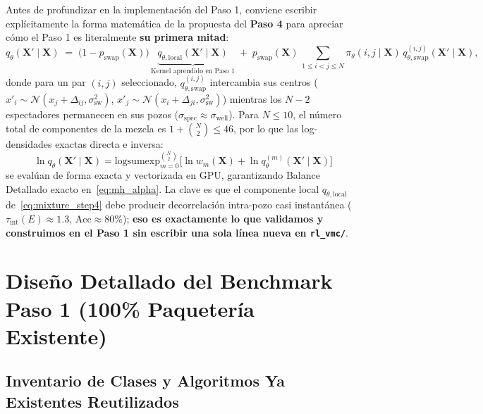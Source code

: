 \documentclass[10pt,a4paper]{article}
\begin{document}
Antes de profundizar en la implementación del Paso 1, conviene escribir explícitamente la forma matemática de la propuesta del \textbf{Paso 4} para apreciar cómo el Paso 1 es literalmente \textbf{su primera mitad}:
\begin{equation}
q_\theta(\bm{X}' \mid \bm{X}) \;=\; \big(1 - p_{\mathrm{swap}}(\bm{X})\big)\, \underbrace{q_{\theta,\mathrm{local}}(\bm{X}' \mid \bm{X})}_{\text{Kernel aprendido en Paso 1}} \;+\; p_{\mathrm{swap}}(\bm{X})\, \sum_{1 \le i < j \le N} \pi_\theta(i, j \mid \bm{X})\, q_{\theta,\mathrm{swap}}^{(i,j)}(\bm{X}' \mid \bm{X}),
\label{eq:mixture_step4}
\end{equation}
donde para un par $(i,j)$ seleccionado, $q_{\theta,\mathrm{swap}}^{(i,j)}$ intercambia sus centros ($x'_i \sim \mathcal{N}(x_j + \Delta_{ij}, \sigma_{\mathrm{sw}}^2)$, $x'_j \sim \mathcal{N}(x_i + \Delta_{ji}, \sigma_{\mathrm{sw}}^2)$) mientras los $N-2$ espectadores permanecen en sus pozos ($\sigma_{\mathrm{spec}} \approx \sigma_{\mathrm{well}}$). Para $N \le 10$, el número total de componentes de la mezcla es $1 + \binom{N}{2} \le 46$, por lo que las log-densidades exactas directa e inversa:
\begin{equation}
\ln q_\theta(\bm{X}' \mid \bm{X}) = \mathrm{logsumexp}_{m=0}^{\binom{N}{2}} \Big[\ln w_m(\bm{X}) + \ln q_\theta^{(m)}(\bm{X}' \mid \bm{X})\Big]
\end{equation}
se evalúan de forma exacta y vectorizada en GPU, garantizando Balance Detallado exacto en~\eqref{eq:mh_alpha}. La clave es que el componente local $q_{\theta,\mathrm{local}}$ de~\eqref{eq:mixture_step4} debe producir decorrelación intra-pozo casi instantánea ($\tau_{\mathrm{int}}(E) \approx 1.3$, $\mathrm{Acc} \approx 80\%$); \textbf{eso es exactamente lo que validamos y construimos en el Paso 1 sin escribir una sola línea nueva en \texttt{rl\_vmc/}}.

\section{Diseño Detallado del Benchmark Paso 1 (100\% Paquetería Existente)}
\label{sec:step1_design}

\subsection{Inventario de Clases y Algoritmos Ya Existentes Reutilizados}
\end{document}
